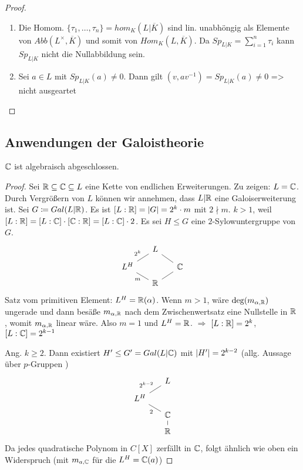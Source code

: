 \documentclass[../main.tex]{subfiles}
\begin{document}
\begin{proof}
    \begin{enumerate}[label=\alph*)]
        \item 
        Die Homom. $\{\tau_1,\dots,\tau_n\} = hom_K(L|\overline{K})$ sind lin. unabhöngig als Elemente von $Abb(L^\times,\overline{K})$ und somit  von $Hom_K(L,\overline{K})$.
        Da $Sp_{L|K} = \sum_{i=1}^n \tau_i$ kann $Sp_{L|K}$ nicht die Nullabbildung sein.
        \item 
        Sei $a\in L$ mit $Sp_{L|K}(a)\neq 0$. Dann gilt $(v, av^{-1}) = Sp_{L|K}(a) \neq 0$ => nicht ausgeartet
    \end{enumerate}
\end{proof}
\subsection{Anwendungen der Galoistheorie}
\begin{reminder*}
    $\mathbb{C}$ ist algebraisch abgeschlossen.
\end{reminder*}
\begin{proof}
    Sei $\mathbb{R}\subseteq\mathbb{C}\subseteq L$ eine Kette von endlichen Erweiterungen.
    Zu zeigen: $L= \mathbb{C}$.
    Durch Vergrößern von $L$ können wir annehmen, dass $L|\mathbb{R}$ eine Galoiserweiterung ist.
    Sei $G\coloneqq Gal(L|\mathbb{R})$.
    Es ist $[L:\mathbb{R}] = \left\vert G \right\vert = 2^k\cdot m$ mit $2\nmid m$.
    $k>1$, weil $[L:\mathbb{R}] = [L:\mathbb{C}] \cdot [\mathbb{C}:\mathbb{R}] = [L:\mathbb{C}] \cdot 2$.
    Es sei $H\leq G$ eine $2$-Sylowuntergruppe von $G$.
    $$
    \begin{tikzcd}[row sep=0.2cm,column sep=0.5cm]
& L \arrow[ld, "2^k"', no head] \arrow[rd, no head] &\\
L^H \arrow[rd, "m"', no head] & & \C \arrow[ld, no head] \\
& \R&
\end{tikzcd}$$
    Satz vom primitiven Element: $L^H= \mathbb{R}(\alpha)$.
    Wenn $m>1$, wäre $\deg(m_{\alpha,\mathbb{R}})$ ungerade und dann besäße $m_{\alpha,\mathbb{R}}$ nach dem Zwischenwertsatz eine Nullstelle in $\mathbb{R}$ , womit  $m_{\alpha,\mathbb{R}}$ linear wäre.
    Also $m=1$ und $L^H= \mathbb{R}$.
    $\Longrightarrow$ $[L:\mathbb{R}] = 2^k$, $[L:\mathbb{C}] = 2^{k-1}$

    Ang. $k\geq 2$. Dann existiert $H'\leq G' = Gal(L|\mathbb{C})$ mit $\left\vert H' \right\vert = 2^{k-2}$ (allg. Aussage über $p$-Gruppen )
    $$
    \begin{tikzcd}[row sep=0.2cm,column sep=0.5cm]
                     & L \arrow[ld, "2^{k-2}"', no head] \\
L^H \arrow[rd, "2"', no head] &                          \\
                     & \C \arrow[d, no head]             \\
                     & \R                      
\end{tikzcd}$$
    Da jedes quadratische Polynom in $C[X]$ zerfällt in $\mathbb{C}$, folgt ähnlich wie oben ein Widerspruch (mit $m_{a,\mathbb{C}}$ für die $L^H=\mathbb{C}(a)$)
\end{proof}
\end{document}
